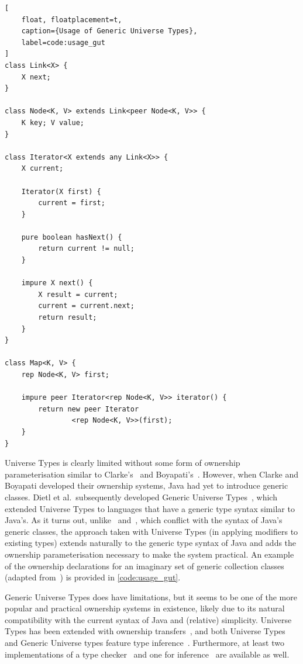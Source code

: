 \documentclass{acm_proc_article-sp}
\begin{document}
\begin{lstlisting}[
	float, floatplacement=t,
	caption={Usage of Generic Universe Types},
	label=code:usage_gut
]
class Link<X> {
	X next;
}

class Node<K, V> extends Link<peer Node<K, V>> {
	K key; V value;
}

class Iterator<X extends any Link<X>> {
	X current;

	Iterator(X first) {
		current = first;
	}

	pure boolean hasNext() {
		return current != null;
	}

	impure X next() {
		X result = current;
		current = current.next;
		return result;
	}
}

class Map<K, V> {
	rep Node<K, V> first;

	impure peer Iterator<rep Node<K, V>> iterator() {
		return new peer Iterator
				<rep Node<K, V>>(first);
	}
}
\end{lstlisting}

Universe Types is clearly limited without some form of ownership
parameterisation similar to Clarke's~\cite{clarke03ownership} and
Boyapati's~\cite{boyapati04safejava}. However, when Clarke and Boyapati
developed their ownership systems, Java had yet to introduce generic classes.
Dietl et al.\ subsequently developed Generic Universe
Types~\cite{dietl07gut,dietl09gut,dietl11gut}, which extended Universe Types to
languages that have a generic type syntax similar to Java's. As it turns out,
unlike~\cite{clarke03ownership} and~\cite{boyapati04safejava}, which conflict
with the syntax of Java's generic classes, the approach taken with Universe
Types (in applying modifiers to existing types) extends naturally to the
generic type syntax of Java and adds the ownership parameterisation necessary
to make the system practical. An example of the ownership declarations for an
imaginary set of generic collection classes (adapted from~\cite{dietl07gut}) is
provided in \cref{code:usage_gut}.

Generic Universe Types does have limitations, but it seems to be one of the more
popular and practical ownership systems in existence, likely due to its natural
compatibility with the current syntax of Java and (relative) simplicity.
Universe Types has been extended with ownership
transfers~\cite{muller07transfer}, and both Universe Types and Generic Universe
types feature type inference~\cite{dietl11inference}. Furthermore, at least two
implementations of a type checker~\cite{cameron10gut,dietl14checker} and one for
inference~\cite{dietl14checker} are available as well.
\end{document}
